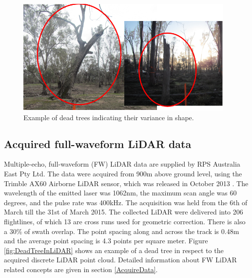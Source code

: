 \documentclass{subfiles}
\begin{document}
\begin{figure} [h!]
	\centering
	\includegraphics[width=0.965\textwidth]{img/dead/DeadTreesExamplePhotos}
	\caption{Example of dead trees indicating their variance in shape.}
	\label{fig:DeadTreesExamplePhotos}
\end{figure}

\subsection{Acquired full-waveform LiDAR data}\label{sec:AcquiredData}

\par Multiple-echo, full-waveform (FW) LiDAR data are supplied by RPS Australia East Pty Ltd. The data were acquired from 900m above ground level, using the Trimble AX60 Airborne LiDAR sensor, which was released in October 2013 \cite{Trimble}. The wavelength of the emitted laser was 1062nm, the maximum scan angle was 60 degrees, and the pulse rate was 400kHz. The acquisition was held from the 6th of March till the 31st of March 2015.  The collected LiDAR were delivered into 206 flightlines, of which 13 are cross runs used for geometric correction. There is also a 30\% of swath overlap. The point spacing along and across the track  is 0.48m and the average point spacing is 4.3 points per square meter. Figure \ref{fig:DeadTreeInLiDAR} shows an example of a dead tree in respect to the acquired discrete LiDAR point cloud.   Detailed information about FW LiDAR related concepts are given in section \ref{AcquireData}.
\end{document}
